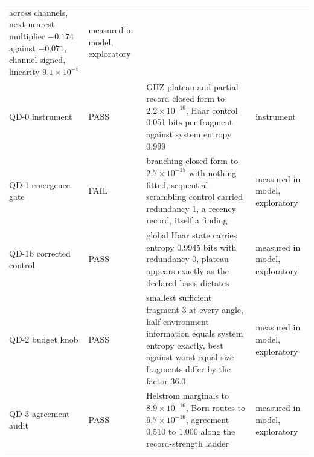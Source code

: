\documentclass[aps,pre,reprint,nofootinbib,floatfix]{revtex4-2}
\begin{document}
\begin{table}[t]
\begin{ruledtabular}
\begin{tabular}{L{1.7cm}lL{10.6cm}L{2.7cm}}
across channels, next-nearest multiplier $+0.174$ against
$-0.071$, channel-signed, linearity $9.1\times10^{-5}$ & measured
in model, exploratory \\
QD-0 instrument & PASS & GHZ plateau and partial-record closed
form to $2.2\times10^{-16}$, Haar control 0.051 bits per fragment
against system entropy 0.999 & instrument \\
QD-1 emergence gate & FAIL & branching closed form to
$2.7\times10^{-15}$ with nothing fitted, sequential scrambling
control carried redundancy 1, a recency record, itself a finding &
measured in model, exploratory \\
QD-1b corrected control & PASS & global Haar state carries entropy
0.9945 bits with redundancy 0, plateau appears exactly as the
declared basis dictates & measured in model, exploratory \\
QD-2 budget knob & PASS & smallest sufficient fragment 3 at every
angle, half-environment information equals system entropy exactly,
best against worst equal-size fragments differ by the factor 36.0 &
measured in model, exploratory \\
QD-3 agreement audit & PASS & Helstrom marginals to
$8.9\times10^{-16}$, Born routes to $6.7\times10^{-16}$, agreement
0.510 to 1.000 along the record-strength ladder & measured in
model, exploratory \\
\end{tabular}
\end{ruledtabular}
\end{table}
\end{document}
